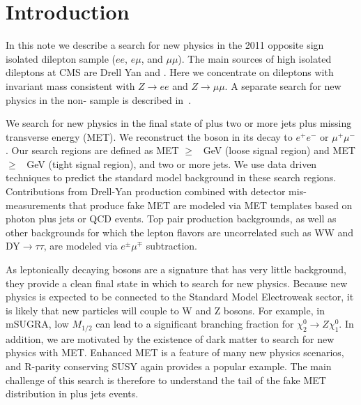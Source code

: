 
\section{Introduction}

In this note we describe a search for new physics in the 2011 
opposite sign isolated dilepton sample ($ee$, $e\mu$, and $\mu\mu$).  
The main sources of high \pt isolated dileptons at CMS are Drell Yan and \ttbar.
Here we concentrate on dileptons with invariant mass consistent
with $Z \to ee$ and $Z \to \mu\mu$.  A separate search for new physics in the non-\Z
sample is described in~\cite{ref:GenericOS}.

We search for new physics in the final state of \Z plus two or more jets plus missing 
transverse energy (MET). We reconstruct the \Z boson
in its decay to $e^+e^-$ or $\mu^+\mu^-$. Our search regions are defined as 
MET $\ge$ \signalmetl~GeV (loose signal region) and MET $\ge$ \signalmett~GeV 
(tight signal region), and two or more jets. We use data driven techniques to predict the
standard model background in these search regions. 
Contributions from Drell-Yan production combined with detector mis-measurements that 
produce fake MET are modeled via MET templates based on photon plus jets or QCD events. 
Top pair production backgrounds, as well as other backgrounds for which the lepton
flavors are uncorrelated such as WW and DY$\rightarrow\tau\tau$, are 
modeled via $e^\pm\mu^\mp$ subtraction.

As leptonically decaying \Z bosons are a signature that has very little background, 
they provide a clean final state in which to search for new physics. 
Because new physics is expected to be connected to the Standard Model Electroweak sector, 
it is likely that new particles will couple to W and Z bosons. 
For example, in mSUGRA, low $M_{1/2}$ can lead to a significant branching fraction 
for $\chi_2^0 \rightarrow Z \chi_1^0$. 
In addition, we are motivated by the existence of dark matter to search for new physics with MET.
Enhanced MET is a feature of many new physics scenarios, and R-parity conserving SUSY 
again provides a popular example. The main challenge of this search is therefore to 
understand the tail of the fake MET distribution in \Z plus jets events.

